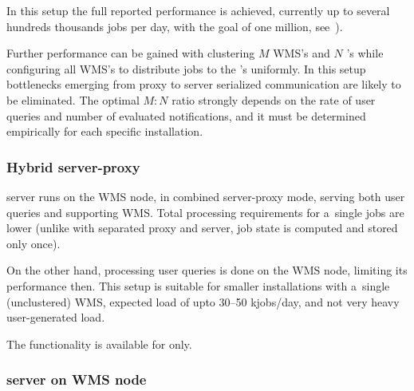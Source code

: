 In this setup the full reported performance is achieved,
currently up to several hundreds thousands jobs per day, with the goal
of one million, see~\cite{lbtp}).

Further performance can be gained with clustering $M$ WMS's and $N$ \LB's
while configuring all WMS's to distribute jobs to the \LB's uniformly.
In this setup bottlenecks emerging from \LB proxy to \LB server serialized
communication are likely to be eliminated.
The optimal $M:N$ ratio strongly depends on the rate of user queries
and number of evaluated notifications,
and it must be determined empirically for each specific installation.

\subsubsection{Hybrid \LB server-proxy}

\LB server runs on the WMS node, in combined server-proxy mode,
serving both user queries and supporting WMS.
Total processing requirements for a~single jobs are lower
(unlike with separated proxy and server, job state is computed and stored only once).

On the other hand, processing user queries is done on the WMS node,
limiting its performance then.
This setup is suitable for smaller installations with a~single (unclustered)
WMS, expected load of upto 30--50 kjobs/day, and not very heavy user-generated
load.

The functionality is available for \LBnew only.


\subsubsection{\LB server on WMS node}


